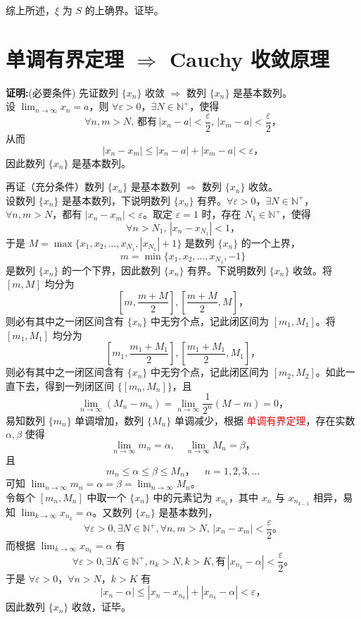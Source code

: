 \documentclass[lang=cn,newtx,10pt,scheme=chinese]{elegantbook}
\begin{document}
综上所述，$\xi $ 为 $S$ 的上确界。证毕。


\section*{单调有界定理 $\Rightarrow$ Cauchy 收敛原理}

\textbf{证明:}(必要条件) 先证数列 $\{x_n\}$ 收敛 $\Rightarrow$ 数列 $\{x_n\}$ 是基本数列。\\
设 $\lim_{n \to \infty} x_n = a$，则 $\forall \varepsilon > 0$，$\exists N \in \mathbb{N}^+$，使得
\[
\forall n, m > N, \, 都有 \, |x_n - a| < \frac{\varepsilon}{2}, \, |x_m - a| < \frac{\varepsilon}{2}，
\]
从而
\[
|x_n - x_m| \leq |x_n - a| + |x_m - a| < \varepsilon，
\]
因此数列 $\{x_n\}$ 是基本数列。

再证（充分条件）数列 $\{x_n\}$ 是基本数列 $\Rightarrow$ 数列 $\{x_n\}$ 收敛。\\
设数列 $\{x_n\}$ 是基本数列，下说明数列 $\{x_n\}$ 有界。$\forall \varepsilon > 0$，$\exists N \in \mathbb{N}^+$，$\forall n, m > N$，都有 $|x_n - x_m| < \varepsilon$。取定 $\varepsilon = 1$ 时，存在 $N_1 \in \mathbb{N}^+$，使得
\[
\forall n > N_1, \, |x_n - x_{N_1}| < 1，
\]
于是 $M = \max \{x_1, x_2, \ldots, x_{N_1}, |x_{N_1}| + 1\}$ 是数列 $\{x_n\}$ 的一个上界，
\[
m = \min \{x_1, x_2, \ldots, x_{N_1}, -1\}
\]
是数列 $\{x_n\}$ 的一个下界，因此数列 $\{x_n\}$ 有界。下说明数列 $\{x_n\}$ 收敛。将 $[m, M]$ 均分为
\[
\left[m, \frac{m + M}{2}\right], \left[\frac{m + M}{2}, M\right]，
\]
则必有其中之一闭区间含有 $\{x_n\}$ 中无穷个点，记此闭区间为 $[m_1, M_1]$。将 $[m_1, M_1]$ 均分为
\[
\left[m_1, \frac{m_1 + M_1}{2}\right], \left[\frac{m_1 + M_1}{2}, M_1\right]，
\]
则必有其中之一闭区间含有 $\{x_n\}$ 中无穷个点，记此闭区间为 $[m_2, M_2]$。如此一直下去，得到一列闭区间 $\{[m_n, M_n]\}$，且
\[
\lim_{n \to \infty} (M_n - m_n) = \lim_{n \to \infty} \frac{1}{2^n} (M - m) = 0，
\]
易知数列 $\{m_n\}$ 单调增加，数列 $\{M_n\}$ 单调减少，根据 \textcolor{red}{单调有界定理}，存在实数 $\alpha, \beta$ 使得
\[
\lim_{n \to \infty} m_n = \alpha, \quad \lim_{n \to \infty} M_n = \beta，
\]
且
\[
m_n \leq \alpha \leq \beta \leq M_n， \quad n = 1, 2, 3, \ldots
\]
可知 $\lim_{n \to \infty} m_n = \alpha = \beta = \lim_{n \to \infty} M_n$。\\
令每个 $[m_n, M_n]$ 中取一个 $\{x_n\}$ 中的元素记为 $x_{n_k}$，其中 $x_n$ 与 $x_{n_{k-1}}$ 相异，易知 $\lim_{k \to \infty} x_{n_k} = \alpha$。又数列 $\{x_n\}$ 是基本数列，
\[
\forall \varepsilon > 0,\exists N \in \mathbb{N}^+, \forall n, m > N, \, |x_n - x_m| < \frac{\varepsilon}{2}。
\]
而根据 $\lim_{k \to \infty} x_{n_k} = \alpha$ 有
\[
\forall \varepsilon > 0, \exists K \in \mathbb{N}^+, n_k > N,k > K,\text{有} \, |x_{n_k} - \alpha| < \frac{\varepsilon}{2}。
\]
于是 $\forall \varepsilon > 0，\forall n > N，k > K$ 有
\[
|x_n - \alpha| \leq |x_n - x_{n_k}| + |x_{n_k} - \alpha| < \varepsilon，
\]
因此数列 $\{x_n\}$ 收敛，证毕。
\end{document}
